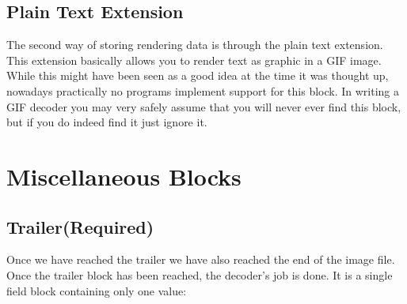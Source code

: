 \begin{refsection}
\begin{algorithm}[H]
\begin{algorithmic}[1]

        \EndIf

        \Else
        \EndIf

        \State {}



          \State {}

          \EndIf
      \EndIf



      \EndWhile

    \end{algorithmic}
  \end{algorithm}

  \subsection{Plain Text Extension}

  The second way of storing rendering data is through the plain text
  extension. This extension basically allows you to render text as
  graphic in a GIF image. While this might have been seen as a good
  idea at the time it was thought up, nowadays practically no programs
  implement support for this block. In writing a GIF decoder you may
  very safely assume that you will never ever find this block, but if
  you do indeed find it just ignore it.

  \section{Miscellaneous Blocks}

  \subsection{Trailer(Required)}

  Once we have reached the trailer we have also reached the end of the
  image file. Once the trailer block has been reached, the decoder's
  job is done. It is a single field block containing only one value:


\end{refsection}
